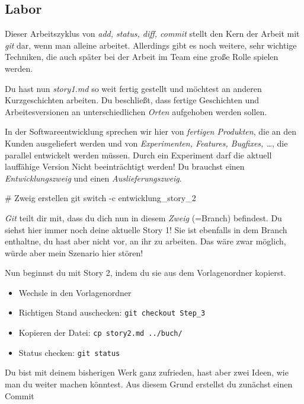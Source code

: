 \documentclass[
  letterpaper,
  DIV=11]{scrreprt}
\newenvironment{Shaded}{\begin{snugshade}}{\end{snugshade}}
\newcommand{\AttributeTok}[1]{\textcolor[rgb]{0.40,0.45,0.13}{#1}}
\newcommand{\CommentTok}[1]{\textcolor[rgb]{0.37,0.37,0.37}{#1}}
\newcommand{\FunctionTok}[1]{\textcolor[rgb]{0.28,0.35,0.67}{#1}}
\newcommand{\NormalTok}[1]{\textcolor[rgb]{0.00,0.23,0.31}{#1}}
\providecommand{\tightlist}{%
  \setlength{\itemsep}{0pt}\setlength{\parskip}{0pt}}\usepackage{longtable,booktabs,array}
\newcommand{\git}{\textit{git}\xspace}
\newcommand{\datei}[1]{\textit{#1}\xspace}
\begin{document}
\subsection{Labor}\label{labor-2}

Dieser Arbeitszyklus von \emph{add, status, diff, commit} stellt den
Kern der Arbeit mit \git dar, wenn man alleine arbeitet. Allerdings gibt
es noch weitere, sehr wichtige Techniken, die auch später bei der Arbeit
im Team eine große Rolle spielen werden.

Du hast nun \datei{story1.md} so weit fertig gestellt und möchtest an
anderen Kurzgeschichten arbeiten. Du beschließt, dass fertige
Geschichten und Arbeitesversionen an unterschiedlichen \emph{Orten}
aufgehoben werden sollen.

In der Softwareentwicklung sprechen wir hier von \emph{fertigen
Produkten}, die an den Kunden ausgeliefert werden und von
\emph{Experimenten, Features, Bugfixes, \ldots{}}, die parallel
entwickelt werden müssen. Durch ein Experiment darf die aktuell
lauffähige Version Nicht beeinträchtigt werden! Du brauchst einen
\emph{Entwicklungszweig} und einen \emph{Auslieferungszweig}.

\begin{Shaded}
\begin{Highlighting}[]
\CommentTok{\# Zweig erstellen }
\FunctionTok{git}\NormalTok{ switch }\AttributeTok{{-}c}\NormalTok{ entwicklung\_story\_2}
\end{Highlighting}
\end{Shaded}

\emph{Git} teilt dir mit, dass du dich nun in diesem \emph{Zweig}
(=Branch) befindest. Du siehst hier immer noch deine aktuelle Story 1!
Sie ist ebenfalls in dem Branch enthaltne, du hast aber nicht vor, an
ihr zu arbeiten. Das wäre zwar möglich, würde aber mein Szenario hier
stören!

Nun beginnst du mit Story 2, indem du sie aus dem Vorlagenordner
kopierst.

\begin{itemize}
\tightlist
\item
  Wechsle in den Vorlagenordner
\item
  Richtigen Stand auschecken: \texttt{git\ checkout\ Step\_3}
\item
  Kopieren der Datei: \texttt{cp\ story2.md\ ../buch/}
\item
  Status checken: \texttt{git\ status}
\end{itemize}

Du bist mit deinem bisherigen Werk ganz zufrieden, hast aber zwei Ideen,
wie man du weiter machen könntest. Aus diesem Grund erstellst du
zunächst einen Commit
\end{document}
